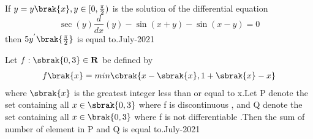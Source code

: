 \item If $y=y\brak{x},y \in [0,\frac{\pi}{2})$ is the solution of the differential equation \[
\sec(y) \frac{d}{dx}(y) - \sin(x + y) - \sin(x - y) = 0\] then $5y^{'}\brak{\frac{\pi}{2}}$ is equal to.\hfill{July-2021}
\item Let $f:\sbrak{0,3}\in \mathbf{R}$ be defined by
\begin{align*}
f\brak{x}=min\cbrak{x-\sbrak{x},1+\sbrak{x}-x}
\end{align*}
where $\sbrak{x}$ is the greatest integer less than or equal to x.Let P denote the set containing all $x\in\sbrak{0,3}$ where f is discontinuous , and Q denote the set containing all $x\in\brak{0,3}$ where f is not differentiable .Then the sum of number of element in P and Q is equal to.\hfill{July-2021}

